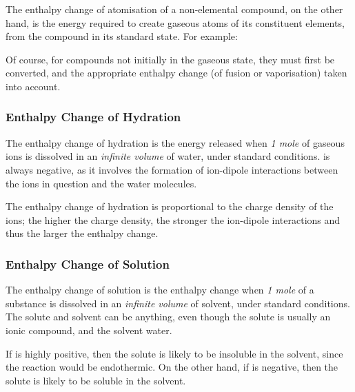 			The enthalpy change of atomisation of a non-elemental compound, on the other hand, is the energy required to create gaseous
			atoms of its constituent elements, from the compound in its standard state. For example:


			Of course, for compounds not initially in the gaseous state, they must first be converted, and the appropriate enthalpy
			change (of fusion or vaporisation) taken into account.



		\subsubsection{Enthalpy Change of Hydration}


			The enthalpy change of hydration is the energy released when \emph{1 mole} of gaseous ions is dissolved in an
			\emph{infinite volume} of water, under standard conditions.  is always negative, as it involves the
			formation of ion-dipole interactions between the ions in question and the water molecules.


			The enthalpy change of hydration is proportional to the charge density of the ions; the higher the charge density,
			the stronger the ion-dipole interactions and thus the larger the enthalpy change.


		\subsubsection{Enthalpy Change of Solution}

			The enthalpy change of solution is the enthalpy change when \emph{1 mole} of a substance is dissolved in an \emph{infinite volume}
			of solvent, under standard conditions. The solute and solvent can be anything, even though the solute is usually an ionic compound,
			and the solvent water.

			If  is highly positive, then the solute is likely to be insoluble in the solvent, since the reaction would be
			endothermic. On the other hand, if  is negative, then the solute is likely to be soluble in the solvent.

